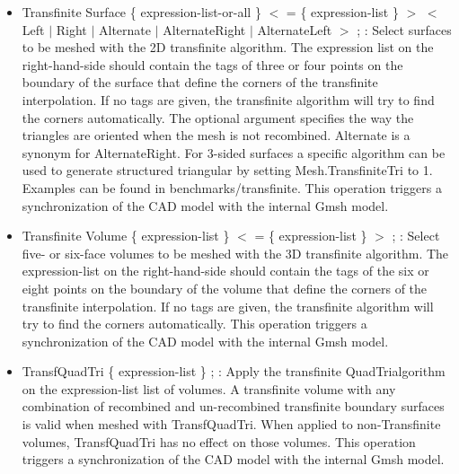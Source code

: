 \documentclass[dvipdfmx, 9pt, a4paper]{article}
\numberwithin{equation}{section}
\begin{document}
\begin{itemize}
\item Transfinite Surface \{ expression-list-or-all \} $<$ = \{ expression-list \} $>$ $<$ Left $|$ Right $|$ Alternate $|$ AlternateRight $|$ AlternateLeft $>$ ; : Select surfaces to be meshed with the 2D transfinite algorithm. The expression list on the right-hand-side should contain the tags of three or four points on the boundary of the surface that define the corners of the transfinite interpolation. If no tags are given, the transfinite algorithm will try to find the corners automatically. The optional argument specifies the way the triangles are oriented when the mesh is not recombined. Alternate is a synonym for AlternateRight. For 3-sided surfaces a specific algorithm can be used to generate structured triangular by setting Mesh.TransfiniteTri to 1. Examples can be found in benchmarks/transfinite. This operation triggers a synchronization of the CAD model with the internal Gmsh model.
\item Transfinite Volume \{ expression-list \} $<$ = \{ expression-list \} $>$ ; : Select five- or six-face volumes to be meshed with the 3D transfinite algorithm. The expression-list on the right-hand-side should contain the tags of the six or eight points on the boundary of the volume that define the corners of the transfinite interpolation. If no tags are given, the transfinite algorithm will try to find the corners automatically. This operation triggers a synchronization of the CAD model with the internal Gmsh model.
\item TransfQuadTri \{ expression-list \} ; : Apply the transfinite QuadTrialgorithm on the expression-list list of volumes. A transfinite volume with any combination of recombined and un-recombined transfinite boundary surfaces is valid when meshed with TransfQuadTri. When applied to non-Transfinite volumes, TransfQuadTri has no effect on those volumes. This operation triggers a synchronization of the CAD model with the internal Gmsh model.
\end{itemize}
\end{document}
